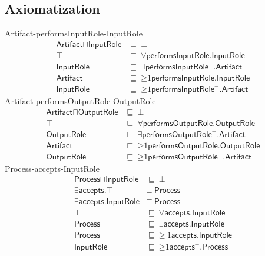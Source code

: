 \subsection{Axiomatization}
\label{axs:1d}
\textsf{Artifact}-\textsf{performsInputRole}-\textsf{InputRole}
\begin{align}
\textsf{Artifact} \sqcap \textsf{InputRole} &\sqsubseteq~\bot \\ %
\textsf{$\top$} &\sqsubseteq~\forall\textsf{performsInputRole.InputRole} \\ %
\textsf{InputRole} &\sqsubseteq~\exists\textsf{performsInputRole}^-\textsf{.Artifact} \\ %
\textsf{Artifact} &\sqsubseteq~\mathord{\geq}1\textsf{performsInputRole.InputRole} \\ %
\textsf{InputRole} &\sqsubseteq~\mathord{\geq}1\textsf{performsInputRole}^-\textsf{.Artifact} %
\end{align}
\textsf{Artifact}-\textsf{performsOutputRole}-\textsf{OutputRole}
\begin{align}
    \textsf{Artifact} \sqcap \textsf{OutputRole} &\sqsubseteq~\bot \\ %
    \textsf{$\top$} &\sqsubseteq~\forall\textsf{performsOutputRole.OutputRole} \\ %
    \textsf{OutputRole} &\sqsubseteq~\exists\textsf{performsOutputRole}^-\textsf{.Artifact} \\ %
    \textsf{Artifact} &\sqsubseteq~\mathord{\geq}1\textsf{performsOutputRole.OutputRole} \\ %
    \textsf{OutputRole} &\sqsubseteq~\mathord{\geq}1\textsf{performsOutputRole}^-\textsf{.Artifact} %
\end{align}
\textsf{Process}-\textsf{accepts}-\textsf{InputRole}
\begin{align}
    \textsf{Process} \sqcap \textsf{InputRole} &\sqsubseteq~\bot \\ %
    \exists\textsf{accepts.$\top$} &\sqsubseteq~\textsf{Process} \\ %
    \exists\textsf{accepts.InputRole} &\sqsubseteq~\textsf{Process} \\ %
    \textsf{$\top$} &\sqsubseteq~\forall\textsf{accepts.InputRole} \\ %
    \textsf{Process} &\sqsubseteq~\exists\textsf{accepts.InputRole} \\ %
    \textsf{Process} &\sqsubseteq~\mathord{\geq}~1\textsf{accepts.InputRole} \\ %
    \textsf{InputRole} &\sqsubseteq~\mathord{\geq}1 \textsf{accepts}^-\textsf{.Process} %
\end{align}
